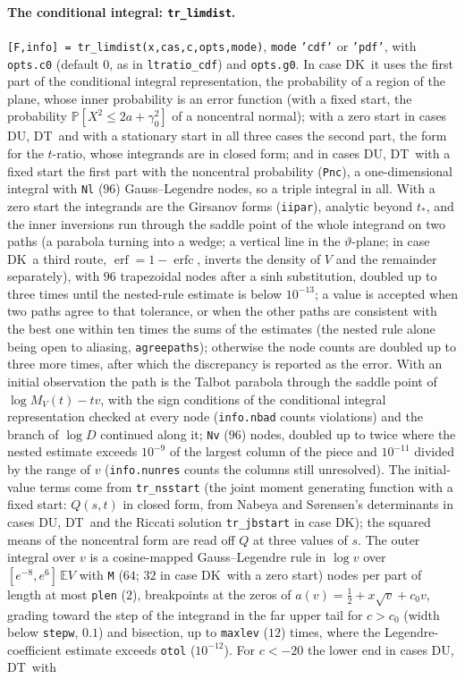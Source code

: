 \documentclass[11pt]{article}
\newcommand{\code}[1]{\texttt{#1}}
\newcommand{\E}{{\mathbb E}}
\newcommand{\PP}{{\mathbb P}}
\newcommand{\Fk}{\textsf{DK}}
\newcommand{\Fu}{\textsf{DU}}
\newcommand{\Ft}{\textsf{DT}}
\begin{document}
\paragraph{The conditional integral: \code{tr\_limdist}.}  \code{[F,info] = tr\_limdist(x,cas,c,opts,mode)}, \code{mode} \code{'cdf'} or \code{'pdf'}, with \code{opts.c0} (default $0$, as in \code{ltratio\_cdf}) and \code{opts.g0}.  In case \Fk\ it uses the first part of the conditional integral representation, the probability of a region of the plane, whose inner probability is an error function (with a fixed start, the probability $\PP[X^2\le2a+\gamma_0^2]$ of a noncentral normal); with a zero start in cases \Fu, \Ft\ and with a stationary start in all three cases the second part, the form for the $t$-ratio, whose integrands are in closed form; and in cases \Fu, \Ft\ with a fixed start the first part with the noncentral probability (\code{Pnc}), a one-dimensional integral with \code{Nl} ($96$) Gauss--Legendre nodes, so a triple integral in all.  With a zero start the integrands are the Girsanov forms (\code{iipar}), analytic beyond $t_*$, and the inner inversions run through the saddle point of the whole integrand on two paths (a parabola turning into a wedge; a vertical line in the $\vartheta$-plane; in case \Fk\ a third route, $\operatorname{erf}=1-\operatorname{erfc}$, inverts the density of $V$ and the remainder separately), with $96$ trapezoidal nodes after a sinh substitution, doubled up to three times until the nested-rule estimate is below $10^{-13}$; a value is accepted when two paths agree to that tolerance, or when the other paths are consistent with the best one within ten times the sums of the estimates (the nested rule alone being open to aliasing, \code{agreepaths}); otherwise the node counts are doubled up to three more times, after which the discrepancy is reported as the error.  With an initial observation the path is the Talbot parabola through the saddle point of $\log M_V(t)-tv$, with the sign conditions of the conditional integral representation checked at every node (\code{info.nbad} counts violations) and the branch of $\log D$ continued along it; \code{Nv} ($96$) nodes, doubled up to twice where the nested estimate exceeds $10^{-9}$ of the largest column of the piece and $10^{-11}$ divided by the range of $v$ (\code{info.nunres} counts the columns still unresolved).  The initial-value terms come from \code{tr\_nsstart} (the joint moment generating function with a fixed start: $Q(s,t)$ in closed form, from Nabeya and S\o rensen's determinants in cases \Fu, \Ft\ and the Riccati solution \code{tr\_jbstart} in case \Fk); the squared means of the noncentral form are read off $Q$ at three values of $s$.  The outer integral over $v$ is a cosine-mapped Gauss--Legendre rule in $\log v$ over $[e^{-8},e^6]\,\E V$ with \code{M} ($64$; $32$ in case \Fk\ with a zero start) nodes per part of length at most \code{plen} ($2$), breakpoints at the zeros of $a(v)=\frac12+x\sqrt v+c_0v$, grading toward the step of the integrand in the far upper tail for $c>c_0$ (width below \code{stepw}, $0.1$) and bisection, up to \code{maxlev} ($12$) times, where the Legendre-coefficient estimate exceeds \code{otol} ($10^{-12}$).  For $c<-20$ the lower end in cases \Fu, \Ft\ with 
\end{document}
